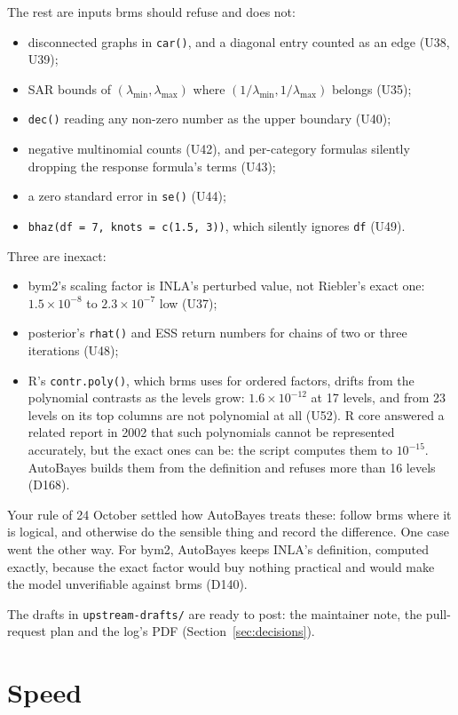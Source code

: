 \documentclass[11pt]{article}
\newcommand{\code}[1]{\texttt{#1}}
\newcommand{\file}[1]{\texttt{#1}}
\begin{document}
The rest are inputs brms should refuse and does not:
\begin{itemize}
\item disconnected graphs in \code{car()}, and a diagonal entry counted as an edge (U38, U39);
\item SAR bounds of $(\lambda_{\min}, \lambda_{\max})$ where $(1/\lambda_{\min}, 1/\lambda_{\max})$ belongs (U35);
\item \code{dec()} reading any non-zero number as the upper boundary (U40);
\item negative multinomial counts (U42), and per-category formulas silently dropping the response formula's terms (U43);
\item a zero standard error in \code{se()} (U44);
\item \code{bhaz(df = 7, knots = c(1.5, 3))}, which silently ignores \code{df} (U49).
\end{itemize}
Three are inexact:
\begin{itemize}
\item bym2's scaling factor is INLA's perturbed value, not Riebler's exact one: $1.5\times10^{-8}$ to $2.3\times10^{-7}$
  low (U37);
\item posterior's \code{rhat()} and ESS return numbers for chains of two or three iterations (U48);
\item R's \code{contr.poly()}, which brms uses for ordered factors, drifts from the polynomial contrasts as the levels
  grow: $1.6\times10^{-12}$ at 17 levels, and from 23 levels on its top columns are not polynomial at all (U52). R core
  answered a related report in 2002 that such polynomials cannot be represented accurately, but the exact ones can be:
  the script computes them to $10^{-15}$. AutoBayes builds them from the definition and refuses more than 16 levels
  (D168).
\end{itemize}
Your rule of 24 October settled how AutoBayes treats these: follow brms where it is logical, and otherwise do the sensible
thing and record the difference. One case went the other way. For bym2, AutoBayes keeps INLA's definition, computed
exactly, because the exact factor would buy nothing practical and would make the model unverifiable against brms (D140).

The drafts in \file{upstream-drafts/} are ready to post: the maintainer note, the pull-request plan and the log's PDF
(Section~\ref{sec:decisions}).

\section{Speed}
\label{sec:speed}
\end{document}
